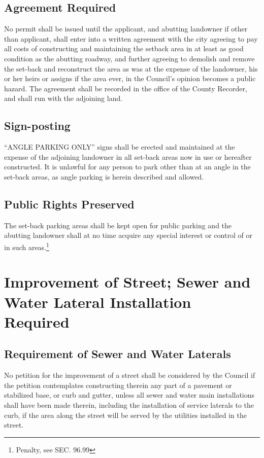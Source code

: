 \subsection{Agreement Required}
No permit shall be issued until the applicant, and abutting landowner if other than applicant, shall enter into a written agreement with the city agreeing to pay all costs of constructing and maintaining the setback area in at least as good condition as the abutting roadway, and further agreeing to demolish and remove the set-back and reconstruct the area as was at the expense of the landowner, his or her heirs or assigns if the area ever, in the Council’s opinion becomes a public hazard.  The agreement shall be recorded in the office of the County Recorder, and shall run with the adjoining land.
\subsection{Sign-posting}
“ANGLE PARKING ONLY” signs shall be erected and maintained at the expense of the adjoining landowner in all set-back areas now in use or hereafter constructed.  It is unlawful for any person to park other than at an angle in the set-back areas, as angle parking is herein described and allowed.
\subsection{Public Rights Preserved}
The set-back parking areas shall be kept open for public parking and the abutting landowner shall at no time acquire any special interest or control of or in such areas.\footnote{Penalty, see SEC. 96.99}

\section{Improvement of Street; Sewer and Water Lateral Installation Required}
\subsection{Requirement of Sewer and Water Laterals}
No petition for the improvement of a street shall be considered by the Council if the petition contemplates constructing therein any part of a pavement or stabilized base, or curb and gutter, unless all sewer and water main installations shall have been made therein, including the installation of service laterals to the curb, if the area along the street will be served by the utilities installed in the street.
